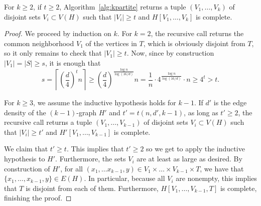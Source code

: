 \documentclass[12pt]{article}
\begin{document}
\begin{theorem}
    For $k \geq 2$, if $t \geq 2$, Algorithm~\ref{alg:kpartite} returns a tuple $(V_1, \dots, V_k)$ of disjoint sets $V_i \subset V(H)$ such that
    $|V_i| \geq t$ and $H[V_1, \dots, V_k]$ is complete.

    \begin{proof}
        We proceed by induction on $k$.
        For $k=2$, the recursive call returns the common neighborhood $V_1$ of the vertices in $T$,
        which is obviously disjoint from $T$, so it only remains to check that $|V_1| \geq t$.
        Now, since by construction $|V_1| = |S| \geq s$, it is enough that
        \[
            s
            = \left\lceil \left( \frac{d}{4} \right)^t n \right\rceil
            \geq \left( \frac{d}{4} \right)^{\frac{\log n}{\log(16/d)}} n
            = \frac{1}{n} \cdot 4^{\frac{\log n}{\log(16/d)}} \cdot n
            \geq 4^t
            > t.
        \]

        For $k \geq 3$, we assume the inductive hypothesis holds for $k-1$.
        If $d'$ is the edge density of the $(k-1)$-graph $H'$
        and $t' = t(n, d', k-1)$, as long as $t' \geq 2$, the recursive call returns
        a tuple $(V_1, \dots, V_{k-1})$ of disjoint sets $V_i \subset V(H)$ such that
        $|V_i| \geq t'$ and $H'[V_1, \dots, V_{k-1}]$ is complete.

        We claim that $t' \geq t$.
        This implies that $t' \geq 2$ so we get to apply the inductive hypothesis to $H'$.
        Furthermore, the sets $V_i$ are at least as large as desired.
        By construction of $H'$, for all $(x_1, \dots x_{k-1}, y) \in V_1 \times \dots \times V_{k-1} \times T$,
        we have that $\{x_1, \dots, x_{k-1}, y\} \in E(H)$.
        In particular, because all $V_i$ are nonempty, this implies that $T$ is disjoint from each of them.
        Furthermore, $H[V_1, \dots, V_{k-1}, T]$ is complete, finishing the proof.


\end{proof}
\end{theorem}
\end{document}
